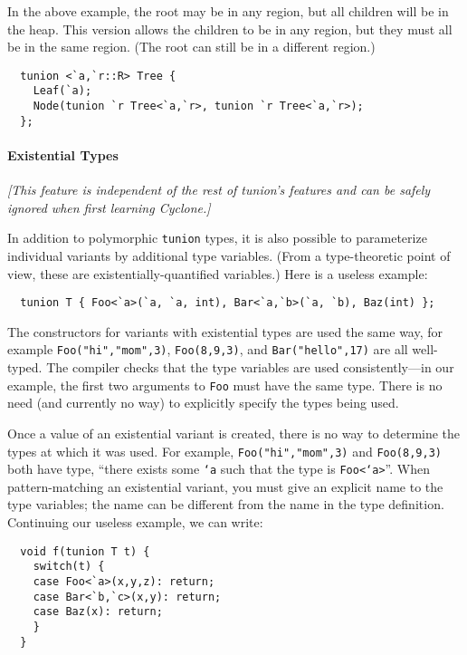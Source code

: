 In the above example, the root may be in any region, but all children
will be in the heap.  This version allows the children to be in any
region, but they must all be in the same region.  (The root can still
be in a different region.)

\begin{verbatim}
  tunion <`a,`r::R> Tree {
    Leaf(`a);
    Node(tunion `r Tree<`a,`r>, tunion `r Tree<`a,`r>);
  };
\end{verbatim}

\paragraph{Existential Types} \textit{[This feature is independent of
  the rest of tunion's features and can be safely ignored when first
  learning Cyclone.]}

In addition to polymorphic \texttt{tunion} types, it is also possible to
parameterize individual variants by additional type variables.  (From
a type-theoretic point of view, these are existentially-quantified
variables.)  Here is a useless example:

\begin{verbatim}
  tunion T { Foo<`a>(`a, `a, int), Bar<`a,`b>(`a, `b), Baz(int) };
\end{verbatim}

The constructors for variants with existential types are used the same
way, for example \texttt{Foo("hi","mom",3)}, \texttt{Foo(8,9,3)}, and
\texttt{Bar("hello",17)} are all well-typed.  The compiler checks that
the type variables are used consistently---in our example, the first
two arguments to \texttt{Foo} must have the same type.  There is no need
(and currently no way) to explicitly specify the types being used.

Once a value of an existential variant is created, there is no way to
determine the types at which it was used.  For example,
\texttt{Foo("hi","mom",3)} and \texttt{Foo(8,9,3)} both have type, ``there
exists some \texttt{`a} such that the type is \texttt{Foo<`a>}''.  When
pattern-matching an existential variant, you must give an explicit
name to the type variables; the name can be different from the name in
the type definition.  Continuing our useless example, we can write:
\begin{verbatim}
  void f(tunion T t) {
    switch(t) {
    case Foo<`a>(x,y,z): return;
    case Bar<`b,`c>(x,y): return;
    case Baz(x): return;
    }
  }
\end{verbatim}


